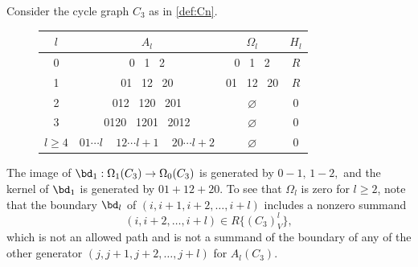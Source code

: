 \begin{example}\label{ex:homology_C3} 
Consider the cycle graph $C_3$ as in \cref{def:Cn}.

\begin{figure}[H]
\centering
        \end{figure}
\begin{figure}[H]
  \centering
         \begin{tabular}{||c||  c | c | c ||} 
         \hline
        $l$ &  $A_l$ & $\Omega_l$ & $H_l$ \\ [.5ex] 
         \hline\hline
        0 &  0 \, 1 \, 2 & 0 \, 1 \, 2 & $R$  \\ 
        \hline
        1 &  01 \, 12 \, 20  & 01 \, 12 \, 20 & $R$ \\
        \hline
        2 & 012 \, 120 \, 201 & $\varnothing$ & 0 \\
        \hline
        3 & 0120 \, 1201 \, 2012 & $\varnothing$ & 0 \\
        \hline
        $l \geq 4$  & $01\cdots l$\,\,\,\,\,  $12\cdots l{+}1$\,\,\,\,\,  $20\cdots l{+}2$& $\varnothing$ & 0 \\ [1ex] 
        \hline
        \end{tabular}
\end{figure}

The image of $\bd_1: \Omega_1(C_3) \to \Omega_0(C_3)$ is generated by $0-1,\, 1-2,$ and the kernel of $\bd_1$ is generated by $01+12+20.$ 
To see that $\Omega_l$ is zero for $l\geq 2$,
note that the boundary $\bd_l$ of $(i, i+1,i+2, \ldots ,i+l)$ includes a nonzero summand $$(i,i+2,\ldots, i+l)\in R\{(C_3)_V^l\},$$ which is not an allowed path and is not a summand of the boundary of any of the other generator $(j,j+1,j+2,\ldots, j+l)$ for $A_l(C_3).$ 
\end{example}

